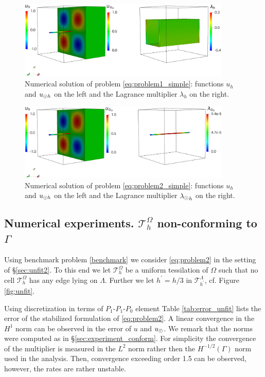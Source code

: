 \begin{figure}
\centering
\includegraphics[width = 0.9\textwidth]{./graphics/mfs_LM2d}
\caption{Numerical solution of problem \eqref{eq:problem1_simple}: functions $u_h$ and $u_{\odot h}$ on the left and the Lagrance multiplier $\lambda_h$ on the right.}\label{fig:sol_benchm1}
\end{figure}


\begin{figure}
\centering
\includegraphics[width = 0.9\textwidth]{./graphics/mfs_LM1d}
\caption{Numerical solution of problem \eqref{eq:problem2_simple}: functions $u_h$ and $u_{\odot h}$ on the left and the Lagrance multiplier ${\lambda_{\odot}}_h$ on the right.}\label{fig:sol_benchm2}
\end{figure}


\subsection{Numerical experiments. $\mathcal{T}^{\Omega}_h$ non-conforming to $\Gamma$}\label{sec:experiment_nonconform}
Using benchmark problem \eqref{benchmark} we consider \eqref{eq:problem2} in the
setting of \S \ref{sec:unfit2}. To this end we let $\mathcal{T}^{\Omega}_h$ be a uniform
tessilation of $\Omega$ such that no cell $\mathcal{T}^{\Omega}_h$ has any edge
lying on $\Lambda$. Further we let $h^{\prime}=h/3$ in $\mathcal{T}^{\Lambda}_{h^{\prime}}$,
cf. Figure \ref{fig:unfit}.

Using discretization in terms of $P_1$-$P_1$-$P_0$ element Table \ref{tab:error_unfit}
lists the error of the stabilized formulation of \eqref{eq:problem2}. A linear
convergence in the $H^1$ norm can be observed in the error of $u$ and $u_{\odot}$. We
remark that the norms were computed as in \S\ref{sec:experiment_conform}. For simplicity
the convergence of the multiplier is measured in the $L^2$ norm rather then the $H^{-1/2}(\Gamma)$
norm used in the analysis. Then, convergence exceeding order 1.5 can be observed, however,
the rates are rather unstable.

